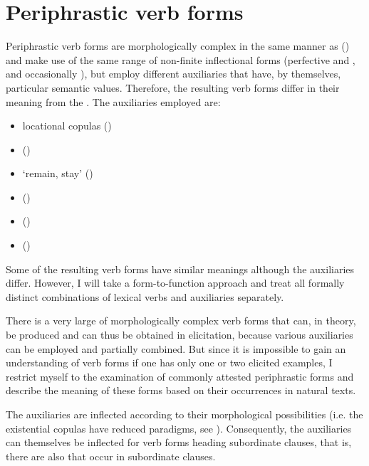 \chapter{Periphrastic verb forms}
\label{cpt:Periphrastic verb forms}

Periphrastic verb forms are morphologically complex in the same manner as  () and make use of the same range of non-finite inflectional forms (perfective and , and occasionally ), but employ different auxiliaries that have, by themselves, particular semantic values. Therefore, the resulting verb forms differ in their meaning from the . The auxiliaries employed are:
%
\begin{itemize}
	\item	locational copulas ()
	\item	{}  ()
	\item	{} `remain, stay' ()
	\item	{}  ()
	\item	{}  ()
	\item	{}  ()
\end{itemize}

Some of the resulting verb forms have similar meanings although the auxiliaries differ. However, I will take a form-to-function approach and treat all formally distinct combinations of lexical verbs and auxiliaries separately.

There is a very large  of morphologically complex verb forms that can, in theory, be produced and can thus be obtained in elicitation, because various auxiliaries can be employed and partially combined. But since it is impossible to gain an understanding of verb forms if one has only one or two elicited examples, I restrict myself to the examination of commonly attested periphrastic forms and describe the meaning of these forms based on their occurrences in natural texts.

The auxiliaries are inflected according to their morphological possibilities (i.e. the existential copulas have reduced paradigms, see ). Consequently, the auxiliaries can themselves be inflected for verb forms heading subordinate clauses, that is, there are also  that occur in subordinate clauses.


